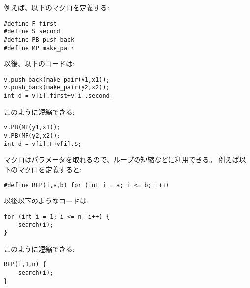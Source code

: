 \begin{comment}
For example, we can define the following macros:
\begin{lstlisting}
#define F first
#define S second
#define PB push_back
#define MP make_pair
\end{lstlisting}
After this, the code
\begin{lstlisting}
v.push_back(make_pair(y1,x1));
v.push_back(make_pair(y2,x2));
int d = v[i].first+v[i].second;
\end{lstlisting}
can be shortened as follows:
\begin{lstlisting}
v.PB(MP(y1,x1));
v.PB(MP(y2,x2));
int d = v[i].F+v[i].S;
\end{lstlisting}
\end{comment}

例えば、以下のマクロを定義する:
\begin{lstlisting}
#define F first
#define S second
#define PB push_back
#define MP make_pair
\end{lstlisting}

以後、以下のコードは:
\begin{lstlisting}
v.push_back(make_pair(y1,x1));
v.push_back(make_pair(y2,x2));
int d = v[i].first+v[i].second;
\end{lstlisting}

このように短縮できる:
\begin{lstlisting}
v.PB(MP(y1,x1));
v.PB(MP(y2,x2));
int d = v[i].F+v[i].S;
\end{lstlisting}


\begin{comment}
A macro can also have parameters
which makes it possible to shorten loops and other
structures.
For example, we can define the following macro:
\begin{lstlisting}
#define REP(i,a,b) for (int i = a; i <= b; i++)
\end{lstlisting}
After this, the code
\begin{lstlisting}
for (int i = 1; i <= n; i++) {
    search(i);
}
\end{lstlisting}
can be shortened as follows:
\begin{lstlisting}
REP(i,1,n) {
    search(i);
}
\end{lstlisting}
\end{comment}

マクロはパラメータを取れるので、ループの短縮などに利用できる。
例えば以下のマクロを定義すると:
\begin{lstlisting}
#define REP(i,a,b) for (int i = a; i <= b; i++)
\end{lstlisting}
以後以下のようなコードは:
\begin{lstlisting}
for (int i = 1; i <= n; i++) {
    search(i);
}
\end{lstlisting}
このように短縮できる:
\begin{lstlisting}
REP(i,1,n) {
    search(i);
}
\end{lstlisting}

